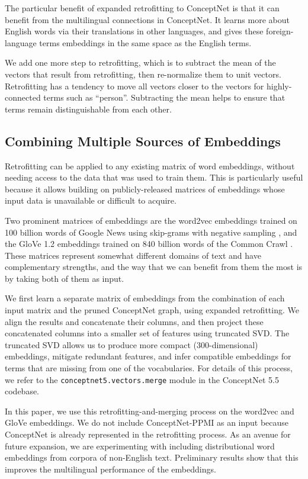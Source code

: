 \documentclass[letterpaper]{article}
\begin{document}
The particular benefit of expanded retrofitting to ConceptNet is that it can
benefit from the multilingual connections in ConceptNet. It learns more about
English words via their translations in other languages, and gives these
foreign-language terms embeddings in the same space as the English terms.

We add one more step to retrofitting, which is to subtract the mean of the
vectors that result from retrofitting, then re-normalize them to unit vectors.
Retrofitting has a tendency to move all vectors closer to the vectors for
highly-connected terms such as ``person''. Subtracting the mean helps to ensure
that terms remain distinguishable from each other.

\subsection{Combining Multiple Sources of Embeddings}

Retrofitting can be applied to any existing matrix of word embeddings, without
needing access to the data that was used to train them. This is particularly
useful because it allows building on publicly-released matrices of embeddings
whose input data is unavailable or difficult to acquire.

Two prominent matrices of embeddings are the word2vec embeddings trained on 100
billion words of Google News using skip-grams with negative sampling
\cite{mikolov2013word2vec}, and the GloVe 1.2 embeddings trained on 840 billion
words of the Common Crawl \cite{pennington2014glove}. These matrices represent
somewhat different domains of text and have complementary strengths, and the
way that we can benefit from them the most is by taking both of them as input.

We first learn a separate matrix of embeddings from the combination of each
input matrix and the pruned ConceptNet graph, using expanded retrofitting. We
align the results and concatenate their columns, and then project these
concatenated columns into a smaller set of features using truncated SVD. The
truncated SVD allows us to produce more compact (300-dimensional) embeddings,
mitigate redundant features, and infer compatible embeddings for terms that
are missing from one of the vocabularies. For details of this process, we
refer to the \texttt{conceptnet5.vectors.merge} module in the ConceptNet 5.5
codebase.

In this paper, we use this retrofitting-and-merging process on the
word2vec and GloVe embeddings. We do not include ConceptNet-PPMI as an input
because ConceptNet is already represented in the retrofitting process. As an
avenue for future expansion, we are experimenting with including distributional
word embeddings from corpora of non-English text. Preliminary results show that
this improves the multilingual performance of the embeddings.
\end{document}
